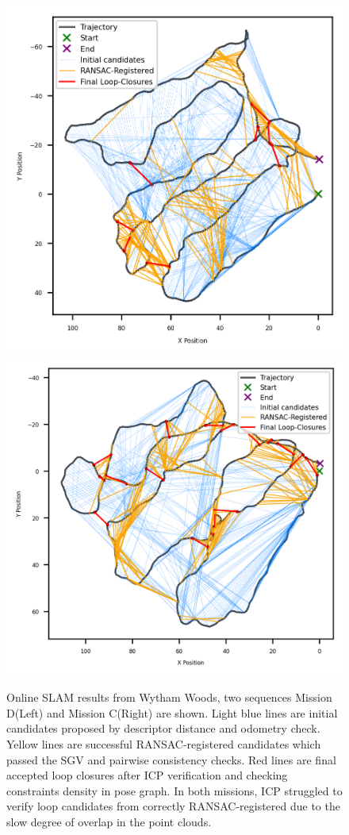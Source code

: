 \begin{figure}[htbp]
  \centering
  \includegraphics[width=0.49\columnwidth]{pics/exp_2_1_wytham_D.png}
  \includegraphics[width=0.49\columnwidth]{pics/exp_2_1_wytham_C.png}
  \caption{Online SLAM results from Wytham Woods, two sequences Mission D(Left) and Mission C(Right) are shown. Light blue lines are initial candidates proposed by descriptor distance and odometry check. Yellow lines are successful RANSAC-registered candidates which passed the SGV and pairwise consistency checks. Red lines are final accepted loop closures after ICP verification and checking constraints density in pose graph. In both missions, ICP struggled to verify loop candidates from correctly RANSAC-registered due to the slow degree of overlap in the point clouds.}
  \label{fig:exp_2_1_wytham_online}
\end{figure}


